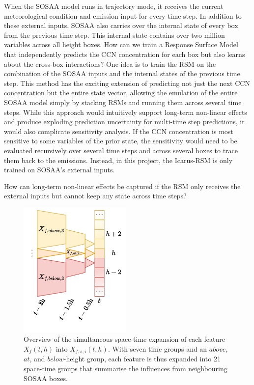 \begin{multicols}{2}
    \noindent When the SOSAA model runs in trajectory mode, it receives the current meteorological condition and emission input for every time step. In addition to these external inputs, SOSAA also carries over the internal state of every box from the previous time step. This internal state contains over two million variables across all height boxes. How can we train a Response Surface Model that independently predicts the CCN concentration for each box but also learns about the cross-box interactions? One idea is to train the RSM on the combination of the SOSAA inputs and the internal states of the previous time step. This method has the exciting extension of predicting not just the next CCN concentration but the entire state vector, allowing the emulation of the entire SOSAA model simply by stacking RSMs and running them across several time steps. While this approach would intuitively support long-term non-linear effects and produce exploding prediction uncertainty for multi-time step predictions, it would also complicate sensitivity analysis. If the CCN concentration is most sensitive to some variables of the prior state, the sensitivity would need to be evaluated recursively over several time steps and across several boxes to trace them back to the emissions. Instead, in this project, the Icarus-RSM is only trained on SOSAA's external inputs.

    \newpar How can long-term non-linear effects be captured if the RSM only receives the external inputs but cannot keep any state across time steps?

    \begin{figure}[H]
        \centering
        \includegraphics[width=0.49\textwidth]{sosaa-data/figures/space-time-expansion.pdf}
        \vspace{-3em}
        \caption[Input Feature Space-Time-Expansion]{Overview of the simultaneous space-time expansion of each feature $X_f(t, h)$ into $X_{f,s,i}(t, h)$. With seven time groups and an $above$, $at$, and $below$-height group, each feature is thus expanded into 21 space-time groups that summarise the influences from neighbouring SOSAA boxes.}
        \label{fig:space-time-expansion}
    \end{figure}
\end{multicols}


